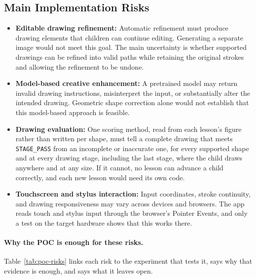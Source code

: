 \documentclass{article}
\begin{document}
\subsection{Main Implementation Risks}

\begin{itemize}
    \item \textbf{Editable drawing refinement:}
    Automatic refinement must produce drawing elements that children
    can continue editing. Generating a separate image would not meet
    this goal. The main uncertainty is whether supported drawings can
    be refined into valid paths while retaining the original strokes
    and allowing the refinement to be undone.

    \item \textbf{Model-based creative enhancement:}
    A pretrained model may return invalid drawing instructions,
    misinterpret the input, or substantially alter the intended
    drawing. Geometric shape correction alone would not establish
    that this model-based approach is feasible.

    \item \textbf{Drawing evaluation:}
    One scoring method, read from each lesson's figure rather than written
    per shape, must tell a complete drawing that meets \texttt{STAGE\_PASS}
    from an incomplete or inaccurate one, for every supported shape and at
    every drawing stage, including the last stage, where the child draws
    anywhere and at any size. If it cannot, no lesson can advance a child
    correctly, and each new lesson would need its own code.

    \item \textbf{Touchscreen and stylus interaction:}
    Input coordinates, stroke continuity, and drawing responsiveness
    may vary across devices and browsers. The app reads touch and
    stylus input through the browser's Pointer Events, and only a test on
    the target hardware shows that this works there.
\end{itemize}

\paragraph{Why the POC is enough for these risks.} Table~\ref{tab:poc-risks}
links each risk to the experiment that tests it, says why that evidence is
enough, and says what it leaves open.
\end{document}
